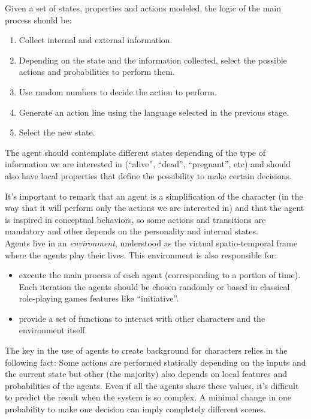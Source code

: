 \documentclass{sig-alternate}
\begin{document}
Given a set of states, properties and actions modeled, the logic of the main process should be:

\begin{enumerate}
\item Collect internal and external information.
\item Depending on the state and the information collected, select the possible actions and probabilities to perform them.
\item Use random numbers to decide the action to perform.
\item Generate an action line using the language selected in the previous stage.
\item Select the new state.
\end{enumerate}


The agent should contemplate different states depending of the type of information we are interested in (``alive'', ``dead'', ``pregnant'', etc) and should also have local properties that define the possibility to make certain decisions.

It's important to remark that an agent is a simplification of the character (in the way that it will perform only the actions we are interested in) and that the agent is inspired in conceptual behaviors, so some actions and transitions are mandatory and other depends on the personality and internal states.\\


Agents live in an {\em environment}, understood as the virtual spatio-temporal frame where the agents play their lives. This environment is also responsible for:
\begin{itemize}
\item execute the main process of each agent (corresponding to a portion of time). Each iteration the agents should be chosen randomly or based in classical role-playing games features like ``initiative''.
\item provide a set of functions to interact with other characters and the environment itself.
\end{itemize}



The key in the use of agents to create background for characters relies in the following fact: Some actions are performed statically depending on the inputs and the current state but other (the majority) also depends on local features and probabilities of the agents. Even if all the agents share these values, it's difficult to predict the result when the system is so complex. A minimal change in one probability to make one decision can imply completely different scenes.\\
\end{document}
